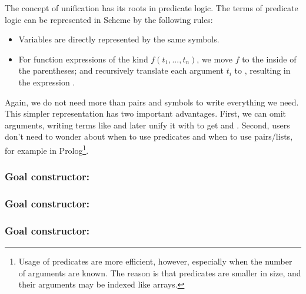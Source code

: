 The concept of unification has its roots in predicate logic. The terms of predicate logic can be represented in Scheme by the following rules:
\begin{itemize}
\item Variables are directly represented by the same symbols.
\item For function expressions of the kind $f(t_1,...,t_n)$, we move $f$ to the inside of the parentheses; and recursively translate each argument $t_i$ to , resulting in the expression .
\end{itemize}

Again, we do not need more than pairs and symbols to write everything we need. This simpler representation has two important advantages. First, we can omit arguments, writing terms like  and later unify it with  to get  and . Second, users don't need to wonder about when to use predicates and when to use pairs/lists, for example in Prolog\footnote{Usage of predicates are more efficient, however, especially when the number of arguments are known. The reason is that predicates are smaller in size, and their arguments may be indexed like arrays.}.

\subsubsection{Goal constructor: }
\subsubsection{Goal constructor: }
\subsubsection{Goal constructor: }
